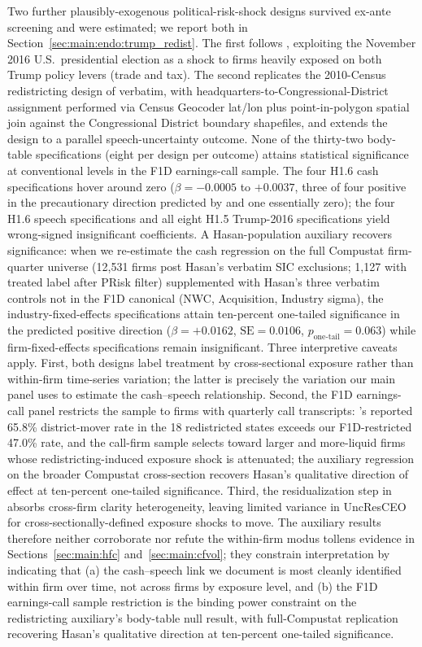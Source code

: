 Two further plausibly-exogenous political-risk-shock designs survived ex-ante screening and were estimated; we report both in Section~\ref{sec:main:endo:trump_redist}. The first follows , exploiting the November 2016 U.S.\ presidential election as a shock to firms heavily exposed on both Trump policy levers (trade and tax). The second replicates the 2010-Census redistricting design of  verbatim, with headquarters-to-Congressional-District assignment performed via Census Geocoder lat/lon plus point-in-polygon spatial join against the  Congressional District boundary shapefiles, and extends the design to a parallel speech-uncertainty outcome. None of the thirty-two body-table specifications (eight per design per outcome) attains statistical significance at conventional levels in the F1D earnings-call sample. The four H1.6 cash specifications hover around zero ($\beta = -0.0005$ to $+0.0037$, three of four positive in the precautionary direction predicted by  and one essentially zero); the four H1.6 speech specifications and all eight H1.5 Trump-2016 specifications yield wrong-signed insignificant coefficients. A Hasan-population auxiliary recovers significance: when we re-estimate the cash regression on the full Compustat firm-quarter universe (12{,}531 firms post Hasan's verbatim SIC exclusions; 1{,}127 with treated label after PRisk filter) supplemented with Hasan's three verbatim controls not in the F1D canonical (NWC, Acquisition, Industry sigma), the industry-fixed-effects specifications attain ten-percent one-tailed significance in the predicted positive direction ($\beta = +0.0162$, $\text{SE} = 0.0106$, $p_{\text{one-tail}} = 0.063$) while firm-fixed-effects specifications remain insignificant. Three interpretive caveats apply. First, both designs label treatment by cross-sectional exposure rather than within-firm time-series variation; the latter is precisely the variation our main panel uses to estimate the cash--speech relationship. Second, the F1D earnings-call panel restricts the sample to firms with quarterly call transcripts: 's reported 65.8\% district-mover rate in the 18 redistricted states exceeds our F1D-restricted 47.0\% rate, and the call-firm sample selects toward larger and more-liquid firms whose redistricting-induced exposure shock is attenuated; the auxiliary regression on the broader Compustat cross-section recovers Hasan's qualitative direction of effect at ten-percent one-tailed significance. Third, the residualization step in  absorbs cross-firm clarity heterogeneity, leaving limited variance in UncResCEO for cross-sectionally-defined exposure shocks to move. The auxiliary results therefore neither corroborate nor refute the within-firm modus tollens evidence in Sections~\ref{sec:main:hfc} and~\ref{sec:main:cfvol}; they constrain interpretation by indicating that (a) the cash--speech link we document is most cleanly identified within firm over time, not across firms by exposure level, and (b) the F1D earnings-call sample restriction is the binding power constraint on the redistricting auxiliary's body-table null result, with full-Compustat replication recovering Hasan's qualitative direction at ten-percent one-tailed significance.

